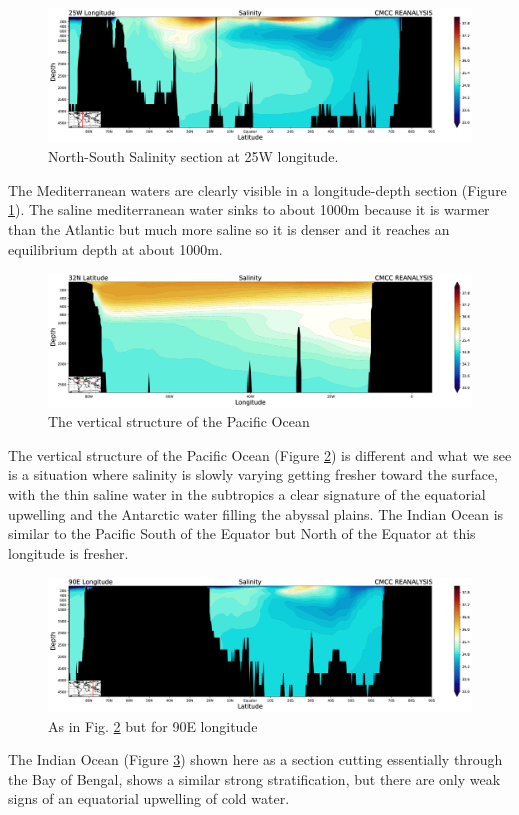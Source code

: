 \begin{figure}[htpb!]
\centering
\includegraphics[width = 0.5 \textwidth]{uploads/31image.png}
\caption{North-South Salinity section at 25W longitude.}
\label{fig:fig6}
\end{figure}

The Mediterranean waters are clearly visible in a longitude-depth
section (Figure \ref{fig:fig6}). The saline mediterranean water sinks
to about 1000m because it is warmer than the Atlantic but much more
saline so it is denser and it reaches an equilibrium depth at about
1000m.

\begin{figure}[htpb!]
    \centering
    \includegraphics[width=0.5\linewidth]{uploads/32image.png}
    \caption{The vertical structure of the Pacific Ocean}
    \label{fig:fig7}
\end{figure}


The vertical structure of the Pacific Ocean (Figure \ref{fig:fig7}) is
different and what we see is a situation where salinity is slowly
varying getting fresher toward the surface, with the thin saline water
in the subtropics a clear signature of the equatorial upwelling and the
Antarctic water filling the abyssal plains. The Indian Ocean is similar
to the Pacific South of the Equator but North of the Equator at this
longitude is fresher.

\begin{figure}[htpb!]
\centering
\includegraphics[width = 0.4 \textwidth]{uploads/33image.png}
\caption{As in Fig. \ref{fig:fig7} but for 90E longitude}
\label{fig: fig8}
\end{figure}

The Indian Ocean (Figure \ref{fig: fig8}) shown here as a section
cutting essentially through the Bay of Bengal, shows a similar strong
stratification, but there are only weak signs of an equatorial upwelling
of cold water.



